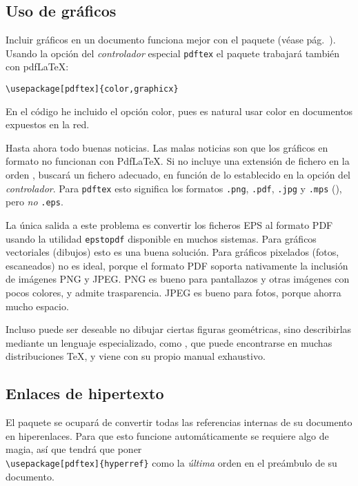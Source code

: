 \subsection{Uso de gráficos}
\label{ssec:pdfgraph}

Incluir gráficos en un documento funciona mejor con el paquete
 (véase pág.~\pageref{eps}). 
Usando la opción del \emph{controlador} especial \texttt{pdftex} el
paquete trabajará también con pdf\LaTeX{}:
\begin{code}
\begin{verbatim}
\usepackage[pdftex]{color,graphicx}
\end{verbatim}
\end{code}
En el código he incluido el opción color, pues es natural usar color
en documentos expuestos en la red.

Hasta ahora todo buenas noticias.  Las malas noticias son que los
gráficos en formato \EPSi{} no funcionan con  Pdf\LaTeX{}.  Si no
incluye una extensión de fichero en la orden ,
 buscará un fichero adecuado, en función de lo
establecido en la opción del \emph{controlador}.  Para \texttt{pdftex}
esto significa los formatos
 \texttt{.png}, \texttt{.pdf}, \texttt{.jpg} y \texttt{.mps} 
(\MP{}), pero \emph{no} \texttt{.eps}.

La única salida a este problema es convertir los ficheros EPS al
formato PDF usando la utilidad \texttt{epstopdf} disponible en muchos
sistemas.  Para gráficos vectoriales (dibujos) esto es una buena
solución.  Para gráficos pixelados (fotos, escaneados) no es ideal,
porque el formato PDF soporta nativamente la inclusión de imágenes PNG
y JPEG.  PNG es bueno para pantallazos y otras imágenes con pocos
colores, y admite trasparencia.  JPEG es bueno para fotos, porque
ahorra mucho espacio.

Incluso puede ser deseable no dibujar ciertas figuras geométricas,
sino describirlas mediante un lenguaje especializado, como 
 \MP{}, que puede encontrarse en muchas
 distribuciones \TeX{}, y viene con su propio manual exhaustivo.

\subsection{Enlaces de hipertexto}
\label{ssec:pdfhyperref}

El paquete  se ocupará de convertir todas las
referencias internas de su documento en hiperenlaces.  Para que esto
funcione automáticamente se requiere algo de magia, así que tendrá que
poner \\
\verb+\usepackage[pdftex]{hyperref}+ como la  \emph{última} orden en
el preámbulo de su documento.

